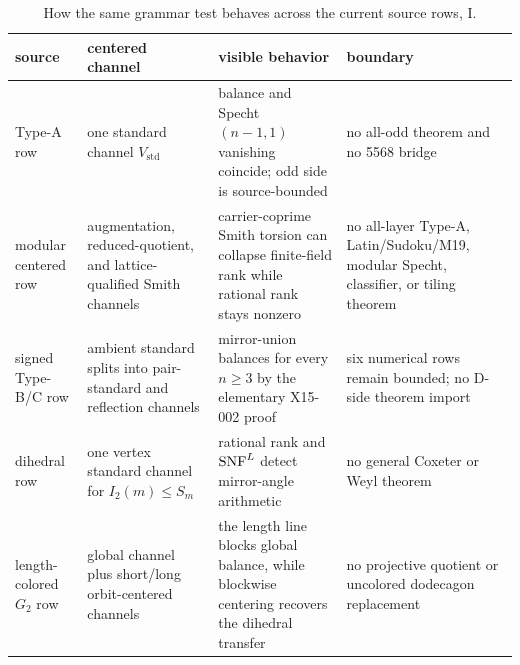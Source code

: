 \begin{table}[!htbp]
\centering
\scriptsize
\setlength{\tabcolsep}{3pt}
\renewcommand{\arraystretch}{0.86}
\caption{How the same grammar test behaves across the current source rows, I.}
\label{tab:abd-contrast}
\begin{tabular}{@{}L{0.16\textwidth}L{0.24\textwidth}L{0.28\textwidth}L{0.24\textwidth}@{}}
\toprule
source & centered channel & visible behavior & boundary \\
\midrule
Type-A row & one standard channel \(V_{\mathrm{std}}\) & balance and Specht \((n-1,1)\) vanishing coincide; odd side is source-bounded & no all-odd theorem and no 5568 bridge \\
modular centered row & augmentation, reduced-quotient, and lattice-qualified Smith channels & carrier-coprime Smith torsion can collapse finite-field rank while rational rank stays nonzero & no all-layer Type-A, Latin/Sudoku/M19, modular Specht, classifier, or tiling theorem \\
signed Type-B/C row & ambient standard splits into pair-standard and reflection channels & mirror-union balances for every \(n\geq3\) by the elementary X15-002 proof & six numerical rows remain bounded; no D-side theorem import \\
dihedral row & one vertex standard channel for \(I_2(m)\leq S_m\) & rational rank and \(\operatorname{SNF}^{L}\) detect mirror-angle arithmetic & no general Coxeter or Weyl theorem \\
length-colored \(G_2\) row & global channel plus short/long orbit-centered channels & the length line blocks global balance, while blockwise centering recovers the dihedral transfer & no projective quotient or uncolored dodecagon replacement \\\bottomrule
\end{tabular}
\end{table}

